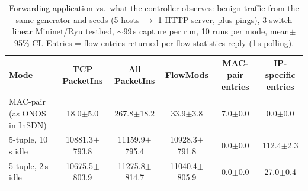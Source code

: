 \begin{table}[t]
\caption{Forwarding application vs.\ what the controller observes: benign traffic from the same generator and seeds (5 hosts $\rightarrow$ 1 HTTP server, plus pings), 3-switch linear Mininet/Ryu testbed, $\sim$99\,s capture per run, 10 runs per mode, mean{\scriptsize$\pm$}95\% CI. Entries = flow entries returned per flow-statistics reply (1\,s polling). }
\label{tab:live_l3}
\centering\small
\begin{tabular}{lccccc}
\toprule
Mode & TCP PacketIns & All PacketIns & FlowMods & MAC-pair entries & IP-specific entries \\
\midrule
MAC-pair (as ONOS in InSDN) & 18.0{\scriptsize$\pm$5.0} & 267.8{\scriptsize$\pm$18.2} & 33.9{\scriptsize$\pm$3.8} & 7.0{\scriptsize$\pm$0.0} & 0.0{\scriptsize$\pm$0.0} \\
5-tuple, 10\,s idle & 10881.3{\scriptsize$\pm$793.8} & 11159.9{\scriptsize$\pm$795.4} & 10928.3{\scriptsize$\pm$791.8} & 0.0{\scriptsize$\pm$0.0} & 112.4{\scriptsize$\pm$2.3} \\
5-tuple, 2\,s idle & 10675.5{\scriptsize$\pm$803.9} & 11275.8{\scriptsize$\pm$814.7} & 11040.4{\scriptsize$\pm$805.9} & 0.0{\scriptsize$\pm$0.0} & 27.0{\scriptsize$\pm$0.4} \\
\bottomrule
\end{tabular}
\end{table}
